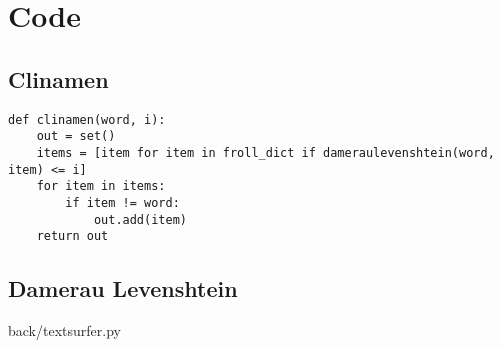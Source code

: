 
\chapter{Code}
\label{app:code}

\section{Clinamen}

\begin{lstlisting}
def clinamen(word, i):
    out = set()
    items = [item for item in froll_dict if dameraulevenshtein(word, item) <= i]
    for item in items:
        if item != word:
            out.add(item)
    return out
\end{lstlisting}


\section{Damerau Levenshtein}


                {back/textsurfer.py}
